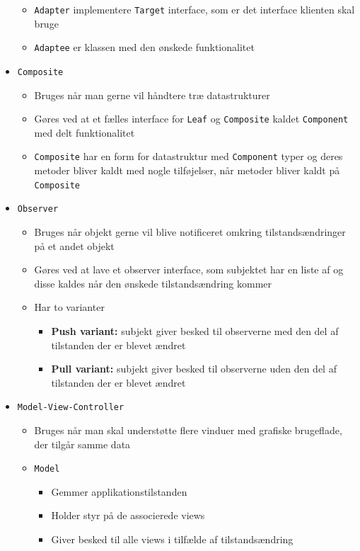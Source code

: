 \documentclass[a4, english]{article}
\begin{document}
\begin{itemize}
\begin{itemize}
    \item \texttt{Adapter} implementere \texttt{Target} interface, som er det interface klienten skal bruge
    \item \texttt{Adaptee} er klassen med den ønskede funktionalitet 
  \end{itemize}
  \item \texttt{Composite}
  \begin{itemize}
  	\item Bruges når man gerne vil håndtere træ datastrukturer
    \item Gøres ved at et fælles interface for \texttt{Leaf} og \texttt{Composite} kaldet \texttt{Component} med delt funktionalitet
    \item \texttt{Composite} har en form for datastruktur med \texttt{Component} typer og deres metoder bliver kaldt med nogle tilføjelser, når metoder bliver kaldt på \texttt{Composite}
  \end{itemize}
  \item \texttt{Observer}
  \begin{itemize}
  	\item Bruges når objekt gerne vil blive notificeret omkring tilstandsændringer på et andet  objekt
    \item Gøres ved at lave et observer interface, som subjektet har en liste af og disse kaldes når den ønskede tilstandsændring kommer
    \item Har to varianter
    \begin{itemize}
    	\item \textbf{Push variant:} subjekt giver besked til observerne med den del af tilstanden der er blevet ændret
      \item \textbf{Pull variant:} subjekt giver besked til observerne uden den del af tilstanden der er blevet ændret 
    \end{itemize}
  \end{itemize}
  \item \texttt{Model-View-Controller}
  \begin{itemize}
  	\item Bruges når man skal understøtte flere vinduer med grafiske brugeflade, der tilgår samme data
    \item \texttt{Model} 
    \begin{itemize}
      \item Gemmer applikationstilstanden
      \item Holder styr på de associerede views
      \item Giver besked til alle views i tilfælde af tilstandsændring

\end{itemize}
\end{itemize}
\end{itemize}
\end{document}
